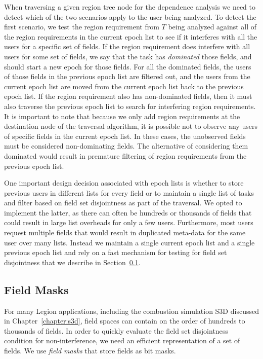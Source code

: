 When traversing a given region tree node for
the dependence analysis we need to detect which
of the two scenarios apply to the user 
being analyzed. To detect the first scenario,
we test the region requirement from $T$ being
analyzed against all of the region requirements
in the current epoch list to see if it interferes
with all the users for a specific set of fields.
If the region requirement does interfere with all
users for some set of fields, we say that the
task has {\em dominated} those fields, and should
start a new epoch for those fields. For all the
dominated fields, the users of those fields in the
previous epoch list are filtered out, and the users
from the current epoch list are moved from the 
current epoch list back to the previous epoch 
list. If the region requirement also has non-dominated
fields, then it must also traverse the previous
epoch list to search for interfering region
requirements.  It is important to note
that because we only add region requirements 
at the destination node of the traversal algorithm,
it is possible not to observe any users of
specific fields in the current epoch list.
In these cases, the unobserved fields must
be considered non-dominating fields. The
alternative of considering them dominated 
would result in premature filtering of region
requirements from the previous epoch list.

One important design decision associated with
epoch lists is whether to store previous
users in different lists for every field
or to maintain a single list of tasks and 
filter based on field set disjointness as
part of the traversal. We opted to implement 
the latter, as there can often be hundreds
or thousands of fields that could result
in large list overheads for only a few
users.  Furthermore, most users request multiple
fields that would result in duplicated 
meta-data for the same user over many lists.
Instead we maintain a single current epoch
list and a single previous epoch list and
rely on a fast mechanism for testing for
field set disjointness that we describe
in Section~\ref{subsec:fieldmasks}.

\subsection{Field Masks}
\label{subsec:fieldmasks}
For many Legion applications, including
the combustion simulation S3D discussed
in Chapter~\ref{chapter:s3d}, field spaces
can contain on the order of hundreds to 
thousands of fields. In order to quickly
evaluate the field set disjointness condition
for non-interference, we need an efficient
representation of a set of fields. We use
{\em field masks} that store fields as
bit masks.


